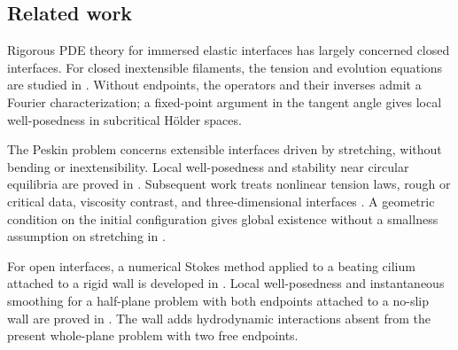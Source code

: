 \documentclass[11pt,reqno]{amsart}
\theoremstyle{plain}
\theoremstyle{definition}
\numberwithin{equation}{section}
\begin{document}

\subsection{Related work}

Rigorous PDE theory for immersed elastic interfaces has largely concerned
closed interfaces. For closed inextensible filaments, the tension and
evolution equations are studied in
\cite{KuoLaiMoriRodenberg2023Tension,
GarciaJuarezKuoMori2025Inextensible}.
Without endpoints, the operators and their inverses admit a Fourier
characterization; a fixed-point argument in the tangent angle gives local
well-posedness in subcritical H\"{o}lder spaces.

The Peskin problem concerns extensible interfaces driven by stretching,
without bending or inextensibility. Local well-posedness and stability
near circular equilibria are proved in
\cite{MoriRodenbergSpirn2019Peskin,LinTong2019StokesIB}.
Subsequent work treats nonlinear tension laws, rough or critical data, viscosity contrast, and three-dimensional interfaces
\cite{CameronStrain2024CriticalPeskin,ChenNguyen2023Bdot,
GarciaJuarezHaziot2025GeneralTension,ChenHuNguyen2026Schauder,
GarciaJuarezMoriStrain2023ViscosityContrast,
GarciaJuarezKuoMoriStrain2025Peskin3D,
GarciaJuarezHaziotKuoMoriZhou2026Peskin3DStability}.
A geometric condition on the initial configuration gives global existence
without a smallness assumption on stretching in
\cite{TongWei2024GeometricPeskin}.

For open interfaces, a numerical Stokes method applied to a beating cilium
attached to a rigid wall is developed in
\cite{LiLayton2012OpenInterface}.
Local well-posedness and instantaneous smoothing for a half-plane problem
with both endpoints attached to a no-slip wall are proved in
\cite{KandalamSpirn2026AnchoredPeskin}.
The wall adds hydrodynamic interactions absent from the present whole-plane
problem with two free endpoints.
\end{document}
